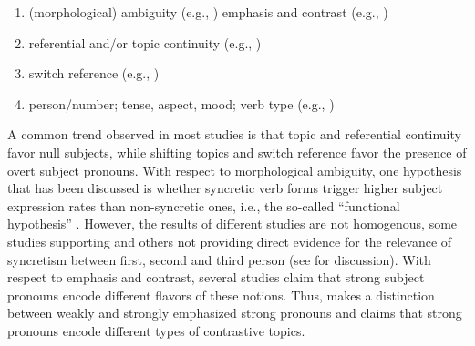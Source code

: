 \documentclass[output=paper]{langscibook}
\begin{document}
\begin{enumerate}
    \item (morphological) ambiguity (e.g., \citealt{Hochberg1986})
  emphasis and contrast (e.g., \citealt{Rigau1989, Luján1999, Mayol2010})
    \item referential and/or topic continuity (e.g., \citealt{Bentivoglio1983})
    \item switch reference (e.g., \citealt{Cameron1993, Silva-Corvalán2001, TravisCacoullos2012})
    \item person/number; tense, aspect, mood; verb type (e.g., \citealt{Enríquez1984, Morales1997, Silva-Corvalán2001, OtheguyEtAl2007, OrozcoGuy2008, Posio2011})
\end{enumerate}


A common trend observed in most studies is that topic and referential continuity favor null subjects, while shifting topics and switch reference favor the presence of overt subject pronouns. With respect to morphological ambiguity, one hypothesis that has been discussed is whether syncretic verb forms trigger higher subject expression rates than non-syncretic ones, i.e., the so-called “functional hypothesis” \citep{Hochberg1986}. However, the results of different studies are not homogenous, some studies supporting and others not providing direct evidence for the relevance of syncretism between first, second and third person (see \citealt{Posio2018} for discussion). With respect to emphasis and contrast, several studies claim that strong subject pronouns encode different flavors of these notions. Thus, \citet{Rigau1989} makes a distinction between weakly and strongly emphasized strong pronouns and \citet{Mayol2010} claims that strong pronouns encode different types of contrastive topics. 
\end{document}
